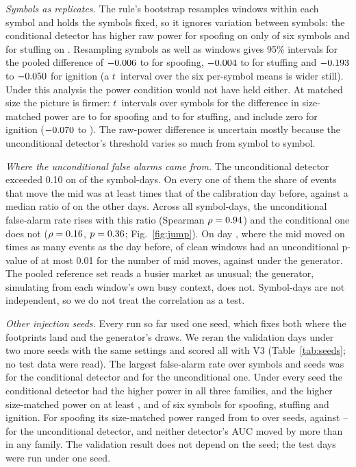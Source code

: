 \documentclass[journal]{IEEEtran}
\begin{document}
\emph{Symbols as replicates.} The rule's bootstrap resamples windows within each symbol and holds the symbols
fixed, so it ignores variation between symbols: the conditional detector has higher raw power for spoofing on
only \dConfSymsSpoof{} of six symbols and for stuffing on \dConfSymsStuff. Resampling symbols as well as windows
gives 95\% intervals for the pooled difference of \(-0.006\) to \xBootHiSpoof{} for spoofing,
\(-0.004\) to \xBootHiStuff{} for stuffing and \(-0.193\) to \(-0.050\) for ignition (a
$t$~interval over the six per-symbol means is wider still). Under this analysis the power condition would not
have held either. At matched size the picture is firmer: $t$~intervals over symbols for the difference in
size-matched power are \xMpowTLoSpoof{} to \xMpowTHiSpoof{} for spoofing and \xMpowTLoStuff{} to \xMpowTHiStuff{}
for stuffing, and include zero for ignition (\(-0.070\) to \xMpowTHiIgnit). The raw-power difference is
uncertain mostly because the unconditional detector's threshold varies so much from symbol to symbol.

\emph{Where the unconditional false alarms came from.} The unconditional detector exceeded 0.10 on
\xSpikeDays{} of the \xJumpDays{} symbol-days. On every one of them the share of events that move the mid was at
least \xSpikeRatioMin{} times that of the calibration day before, against a median ratio of \xCalmRatioMedian{}
on the other days. Across all symbol-days, the unconditional false-alarm rate rises with this ratio (Spearman
$\rho=0.94$) and the conditional one does not ($\rho=0.16$, $p=0.36$; Fig.~\ref{fig:jump}). On
\xWorstSym{} day \xWorstDay, where the mid moved on \xWorstRatio{} times as many events as the day before,
\xWorstTailUnc{} of clean windows had an unconditional p-value of at most 0.01 for the number of mid moves,
against \xWorstTailGen{} under the generator. The pooled reference set reads a busier market as unusual; the
generator, simulating from each window's own busy context, does not. Symbol-days are not independent, so we do
not treat the correlation as a test.

\emph{Other injection seeds.} Every run so far used one seed, which fixes both where the footprints land and the
generator's draws. We reran the validation days under two more seeds with the same settings and scored all
\seedCount{} with V3 (Table~\ref{tab:seeds}; no test data were read). The largest false-alarm rate over symbols and seeds
was \seedFaMaxGen{} for the conditional detector and \seedFaMaxUnc{} for the unconditional one. Under every seed
the conditional detector had the higher power in all three families, and the higher size-matched power on at
least \seedMpowSymMinSpoof, \seedMpowSymMinStuff{} and \seedMpowSymMinIgnit{} of six symbols for spoofing,
stuffing and ignition. For spoofing its size-matched power ranged from \seedMpowGenLoSpoof{} to
\seedMpowGenHiSpoof{} over seeds, against \seedMpowUncLoSpoof--\seedMpowUncHiSpoof{} for the unconditional
detector, and neither detector's AUC moved by more than \seedAucRangeMax{} in any family. The validation result does not depend on the seed;
the test days were run under one seed.
\end{document}
